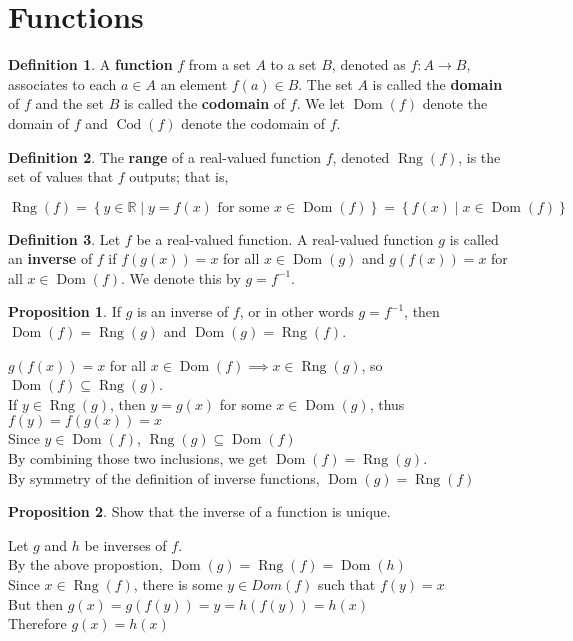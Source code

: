 \documentclass{article}
\theoremstyle{definition}
\newtheorem{definition}{Definition}[section]
\newtheorem{proposition}{Proposition}[definition]
\DeclareMathOperator*{\Dom}{Dom}
\DeclareMathOperator*{\Rng}{Rng}
\DeclareMathOperator*{\Cod}{Cod}
\begin{document}
\section{Functions}
\begin{definition}
    A \textbf{function} $f$ from a set $A$ to a set $B$,
    denoted as $f : A \rightarrow B$, associates to each $a
    \in A$ an element $f(a) \in B$. The set $A$ is called
    the \textbf{domain} of $f$ and the set $B$ is called the
    \textbf{codomain} of $f$. We let $\Dom(f)$ denote the 
    domain of $f$ and $\Cod(f)$ denote the codomain of $f$.
\end{definition}
\begin{definition}
    The \textbf{range} of a real-valued function $f$, denoted
    $\Rng(f)$, is the set of values that $f$ outputs; that is,
    \begin{center}
        $\Rng(f) = \left\{ y \in \mathbb{R} \mid
        y = f(x) \text{ for some } x \in \Dom(f) \right\} = 
        \left\{ f(x) \mid x \in \Dom(f) \right\}$
    \end{center}
\end{definition}
\begin{definition}
    Let $f$ be a real-valued function. A real-valued function
    $g$ is called an \textbf{inverse} of $f$ if $f(g(x)) = x$
    for all $x \in \Dom(g)$ and $g(f(x)) = x$ for all $x \in 
    \Dom(f)$. We denote this by $g = f^{-1}$.
    \begin{proposition}
    If $g$ is an inverse of $f$, or in other words
    $g=f^{-1}$, then $\Dom(f) = \Rng(g)$ and 
    $\Dom(g) = \Rng(f)$.    
    \begin{center}
        $g(f(x)) = x$ for all $x \in \Dom(f) \implies x \in
        \Rng(g)$, so $\Dom(f) \subseteq \Rng(g)$.\\
        If $y \in \Rng(g)$, then $y = g(x)$ for some 
        $x \in \Dom(g)$, thus $f(y) = f(g(x)) = x$\\
        Since $y \in \Dom(f)$, $\Rng(g) \subseteq \Dom(f)$ \\
        By combining those two inclusions, we get $\Dom(f) = 
        \Rng(g)$.\\
        By symmetry of the definition of inverse functions,
        $\Dom(g) = \Rng(f)$
    \end{center}
    \end{proposition}
    \begin{proposition}
        Show that the inverse of a function is unique.
        \begin{center}
            Let $g$ and $h$ be inverses of $f$.\\
            By the above propostion, $\Dom(g) = \Rng(f) =
            \Dom(h)$\\
            Since $x \in \Rng(f)$, there is some $y \in Dom(f)$
            such that $f(y) = x$\\
            But then $g(x) = g(f(y)) = y = h(f(y)) = h(x)$\\
            Therefore $g(x) = h(x)$
        \end{center}
    \end{proposition}
\end{definition}
\end{document}
